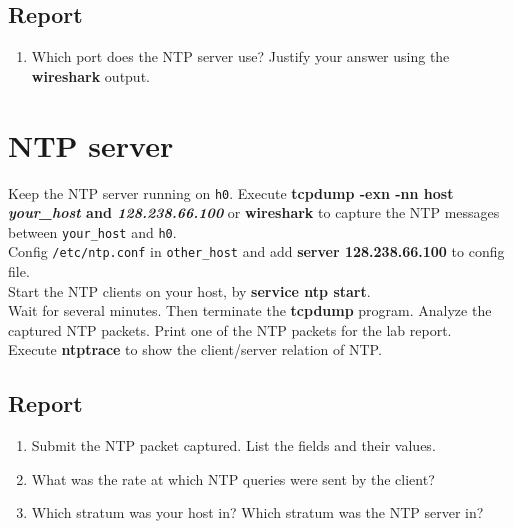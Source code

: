 \documentclass[10pt,a4paper]{article}
\numberwithin{equation}{section}
\numberwithin{figure}{section}
\numberwithin{table}{section}
\begin{document}
    \subsection*{Report}
    \begin{enumerate}
        \item Which port does the NTP server use?
        Justify your answer using the \textbf{wireshark} output.
    \end{enumerate}

\section{NTP server}
    Keep the NTP server running on \texttt{h0}. Execute \textbf{tcpdump -exn -nn host \textit{your\_host} and \textit{128.238.66.100}} or \textbf{wireshark} to capture the NTP messages between \texttt{your\_host} and \texttt{h0}.\\
    Config \texttt{/etc/ntp.conf} in \texttt{other\_host} and add \textbf{server 128.238.66.100} to config file.\\
    Start the NTP clients on your host, by \textbf{service ntp start}.\\
    Wait for several minutes. Then terminate the \textbf{tcpdump} program. Analyze the captured NTP packets. Print one of the NTP packets for the lab report.\\
    Execute \textbf{ntptrace} to show the client/server relation of NTP.\\

    \subsection*{Report}
    \begin{enumerate}
        \item Submit the NTP packet captured. List the fields and their values.
        \item What was the rate at which NTP queries were sent by the client?
        \item Which stratum was your host in? Which stratum was the NTP server in?
    \end{enumerate}
\end{document}
